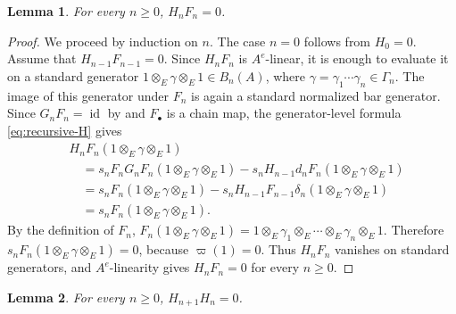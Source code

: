 \documentclass[11pt,a4paper,reqno]{amsart}
\newcommand{\id}{\operatorname{id}}
\theoremstyle{plain}
\newtheorem{lemma}[lemma]{Lemma}
\theoremstyle{definition}
\numberwithin{equation}{section}
\begin{document}
	\begin{lemma}\label{lem:HF-zero}
		For every $n\geq0$, $H_nF_n=0$.
	\end{lemma}
	
	\begin{proof}
		We proceed by induction on $n$.  The case $n=0$ follows from $H_0=0$.
		Assume that
		$H_{n-1}F_{n-1}=0$.
		Since $H_nF_n$ is $A^e$-linear, it is enough to evaluate it on a standard
		generator
		$1\otimes_E\gamma\otimes_E1\in B_n(A)$, where $\gamma=\gamma_1\cdots\gamma_n\in\Gamma_n$.
		The image of this generator under $F_n$ is again a standard normalized
		bar generator.  Since $G_nF_n=\id$ by  and
		$F_\bullet$ is a chain map, the generator-level formula
		\eqref{eq:recursive-H} gives
		\begin{align*}
			&H_nF_n(1\otimes_E\gamma\otimes_E1)
			\\
			&\quad=
			s_nF_nG_nF_n(1\otimes_E\gamma\otimes_E1)
			-
			s_nH_{n-1}d_nF_n(1\otimes_E\gamma\otimes_E1)
			\\
			&\quad=
			s_nF_n(1\otimes_E\gamma\otimes_E1)
			-
			s_nH_{n-1}F_{n-1}
			\delta_n(1\otimes_E\gamma\otimes_E1)
			\\
			&\quad=
			s_nF_n(1\otimes_E\gamma\otimes_E1).
		\end{align*}
		By the definition of $F_n$,
		$F_n(1\otimes_E\gamma\otimes_E1) = 1\otimes_E\gamma_1\otimes_E\cdots \otimes_E\gamma_n\otimes_E1$.
		Therefore
		$s_nF_n(1\otimes_E\gamma\otimes_E1)=0$,
		because $\varpi(1)=0$.  Thus $H_nF_n$ vanishes on standard generators,
		and $A^e$-linearity gives $H_nF_n=0$ for every $n\geq0$.
	\end{proof}
	
	\begin{lemma}\label{lem:HH-zero}
		For every $n\geq0$, $H_{n+1}H_n=0$.
	\end{lemma}
	
\end{document}
